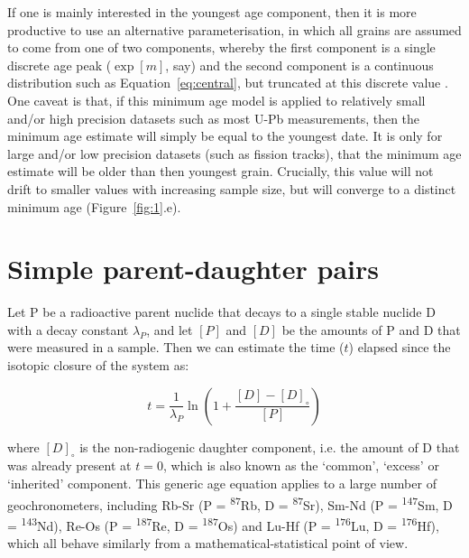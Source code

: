 \documentclass{article}
\begin{document}
If one is mainly interested in the youngest age component, then it is
more productive to use an alternative parameterisation, in which all
grains are assumed to come from one of two components, whereby the
first component is a single discrete age peak ($\exp[m]$, say) and the
second component is a continuous distribution such as
Equation~\ref{eq:central}, but truncated at this discrete value
\citep[][p.107]{touw1997, galbraith2005}.\\

One caveat is that, if this minimum age model is applied to relatively
small and/or high precision datasets such as most U-Pb measurements,
then the minimum age estimate will simply be equal to the youngest
date.  It is only for large and/or low precision datasets (such as
fission tracks), that the minimum age estimate will be older than then
youngest grain.  Crucially, this value will not drift to smaller
values with increasing sample size, but will converge to a distinct
minimum age (Figure~\ref{fig:1}.e).

\section{Simple parent-daughter pairs}
\label{sec:PD}

Let P be a radioactive parent nuclide that decays to a single stable
nuclide D with a decay constant $\lambda_P$, and let $[P]$ and $[D]$
be the amounts of P and D that were measured in a sample. Then we can
estimate the time ($t$) elapsed since the isotopic closure of the
system as:

\begin{equation}
  t = \frac{1}{\lambda_P}\ln\left(1 + \frac{[D]-[D]_\circ}{[P]}\right)
  \label{eq:PD}
\end{equation}

\noindent where $[D]_\circ$ is the non-radiogenic daughter component,
i.e. the amount of D that was already present at $t = 0$, which is
also known as the `common', `excess' or `inherited' component. This
generic age equation applies to a large number of geochronometers,
including Rb-Sr (P = \textsuperscript{87}Rb, D =
\textsuperscript{87}Sr), Sm-Nd (P = \textsuperscript{147}Sm, D =
\textsuperscript{143}Nd), Re-Os (P = \textsuperscript{187}Re, D =
\textsuperscript{187}Os) and Lu-Hf (P = \textsuperscript{176}Lu, D =
\textsuperscript{176}Hf), which all behave similarly from a
mathematical-statistical point of view.\\
\end{document}
